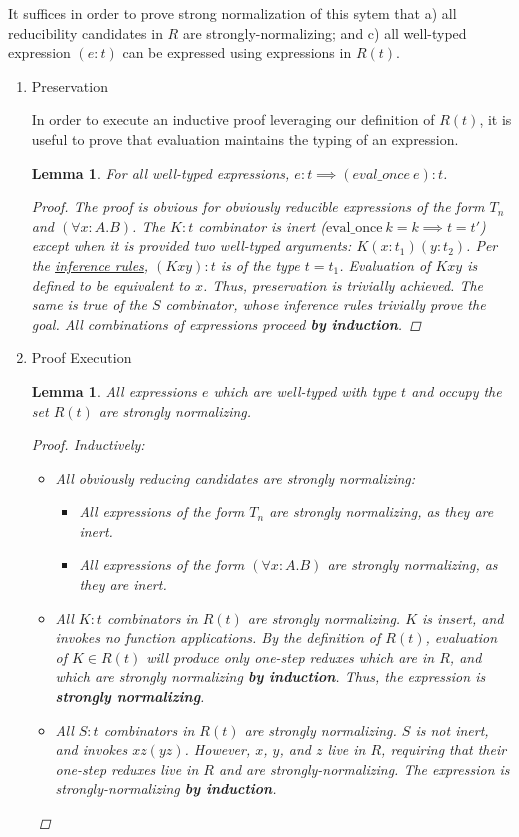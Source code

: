 \documentclass[11pt]{article}
\newtheorem{lemma}[theorem]{Lemma}
\begin{document}
It suffices in order to prove strong normalization of this sytem that a) all reducibility candidates in \(R\) are strongly-normalizing; and c) all well-typed expression \((e : t)\) can be expressed using expressions in \(R(t)\).
\begin{enumerate}
\item Preservation
\label{sec:org5ca44c0}

In order to execute an inductive proof leveraging our definition of \(R(t)\), it is useful to prove that evaluation maintains the typing of an expression.

\begin{lemma}
For all well-typed expressions, $e : t \implies (eval\_once\ e) : t$.
\begin{proof}
The proof is obvious for obviously reducible expressions of the form $T_{n}$ and $(\forall x:A.B)$.
The $K : t$ combinator is inert ($\text{eval\_once}\ k = k \implies t = t'$) except when it is provided two well-typed arguments: $K (x : t_{1}) (y : t_{2})$.
Per the \href{inference:1}{inference rules}, $(K x y) : t$ is of the type $t = t_{1}$.
Evaluation of $K x y$ is defined to be equivalent to $x$. Thus, preservation is trivially achieved.
The same is true of the $S$ combinator, whose inference rules trivially prove the goal. All combinations of expressions proceed \textbf{by induction}.
\end{proof}
\end{lemma}
\item Proof Execution
\label{sec:orgabf9d06}

\begin{lemma}
All expressions $e$ which are well-typed with type $t$ and occupy the set $R(t)$ are strongly normalizing.
\begin{proof}
Inductively: \\
\begin{itemize}
\item All obviously reducing candidates are strongly normalizing:
\begin{itemize}
\item All expressions of the form $T_{n}$ are strongly normalizing, as they are inert.
\item All expressions of the form $(\forall x : A.B)$ are strongly normalizing, as they are inert.
\end{itemize}
\item All $K : t$ combinators in $R(t)$ are strongly normalizing. $K$ is insert, and invokes no function applications. By the definition of $R(t)$, evaluation of $K \in R(t)$ will produce only one-step reduxes which are in $R$, and which are strongly normalizing \textbf{by induction}. Thus, the expression is \textbf{strongly normalizing}.
\item All $S : t$ combinators in $R(t)$ are strongly normalizing. $S$ is not inert, and invokes $xz (yz)$. However, $x$, $y$, and $z$ live in $R$, requiring that their one-step reduxes live in $R$ and are strongly-normalizing. The expression is strongly-normalizing \textbf{by induction}.
\end{itemize}
\end{proof}
\end{lemma}


\end{enumerate}
\end{document}
